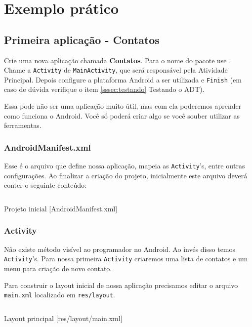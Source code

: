 \chapter{Exemplo prático}

\section{Primeira aplicação - Contatos}

Crie uma nova aplicação chamada \textbf{Contatos}. Para o nome do pacote use .
Chame a \texttt{Activity} de \texttt{MainActivity}, que será responsável pela Atividade Principal. Depois
configure a plataforma Android a ser utilizada e \texttt{Finish} (em caso de dúvida verifique o item
\ref{sssec:testando} Testando o ADT).

Essa pode não ser uma aplicação muito útil, mas com ela poderemos aprender como funciona o Android. Você
só poderá criar algo se você souber utilizar as ferramentas.

\subsection{AndroidManifest.xml}

Esse é o arquivo que define nossa aplicação, mapeia as \texttt{Activity}'s, entre outras configurações. Ao finalizar
a criação do projeto, inicialmente este arquivo deverá conter o seguinte conteúdo:

\begin{listing}[H]
  \inputminted[linenos=true,frame=bottomline,tabsize=3]{ xml }{ source/AndroidManifest-1.xml }
  \caption{Projeto inicial [AndroidManifest.xml]}
\end{listing}

\subsection{Activity}

Não existe método  visível ao programador no Android. Ao invés disso temos \texttt{Activity}'s.
Para nossa primeira \texttt{Activity} criaremos uma lista de contatos e um menu para criação de novo contato.

Para construir o layout inicial de nossa aplicação precisamos editar o arquivo \texttt{main.xml} localizado em
\texttt{res/layout}.

\begin{listing}[H]
  \inputminted[linenos=true,frame=bottomline,tabsize=3]{ xml }{ source/main-1.xml }
  \caption{Layout principal [res/layout/main.xml]}
\end{listing}

